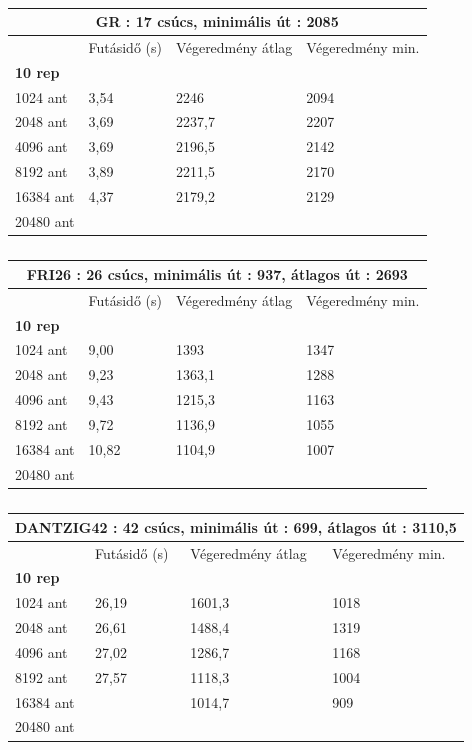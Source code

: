 \begin{table}[ht!]
	\centering
	\begin{tabular}{|p{2cm}||p{3cm}|p{3.5cm}|p{3.5cm}|}
		\hline
		\multicolumn{4}{|c|}{GR : 17 csúcs, minimális út : 2085} \\
		\hline
		& Futásidő (s) & Végeredmény átlag & Végeredmény min.\\
		\hline
		\textbf{10 rep} & & & \\
		1024 ant & 3,54 & 2246 & 2094\\
		2048 ant & 3,69 & 2237,7 & 2207\\
		4096 ant & 3,69 & 2196,5 & 2142\\
		8192 ant & 3,89 & 2211,5 & 2170\\
		16384 ant & 4,37 & 2179,2 & 2129\\
		20480 ant &  &  & \\
		\hline
	\end{tabular}
	\caption{}
	\label{table:TSPv2_17}
\end{table}

\begin{table}[ht!]
	\centering
	\begin{tabular}{|p{2cm}||p{3cm}|p{3.5cm}|p{3.5cm}|}
		\hline
		\multicolumn{4}{|c|}{FRI26 : 26 csúcs, minimális út : 937, átlagos út : 2693} \\
		\hline
		& Futásidő (s) & Végeredmény átlag & Végeredmény min.\\
		\hline
		\textbf{10 rep} & & & \\
		1024 ant & 9,00 & 1393 & 1347\\
		2048 ant & 9,23 & 1363,1 & 1288\\
		4096 ant & 9,43 & 1215,3 & 1163\\
		8192 ant & 9,72 & 1136,9 & 1055\\
		16384 ant & 10,82 & 1104,9 & 1007\\
		20480 ant &  &  & \\
		\hline
	\end{tabular}
	\caption{}
	\label{table:TSPv2_26}
\end{table}

\begin{table}[ht!]
	\centering
	\begin{tabular}{|p{2cm}||p{3cm}|p{3.5cm}|p{3.5cm}|}
		\hline
		\multicolumn{4}{|c|}{DANTZIG42 : 42 csúcs, minimális út : 699, átlagos út : 3110,5} \\
		\hline
		& Futásidő (s) & Végeredmény átlag & Végeredmény min.\\
		\hline
		\textbf{10 rep} & & & \\
		1024 ant & 26,19 & 1601,3 & 1018\\
		2048 ant & 26,61 & 1488,4 & 1319\\
		4096 ant & 27,02 & 1286,7 & 1168\\
		8192 ant & 27,57 & 1118,3 & 1004\\
		16384 ant &  & 1014,7 & 909\\
		20480 ant &  &  & \\
		\hline
	\end{tabular}
	\caption{}
	\label{table:TSPv2_42}
\end{table}

